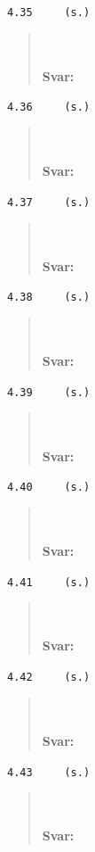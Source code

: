 \documentclass[a4paper]{article}
\newcommand{\tskcol}[1]{\textcolor{tskcol}{#1}}
\begin{document}
\texttt{\tskcol{4.35~~~~ (s.)}}
\begin{quotation}
	\noindent
	\\ \\
	\textbf{Svar:}
\end{quotation}

\texttt{\tskcol{4.36~~~~ (s.)}}
\begin{quotation}
	\noindent
	\\ \\
	\textbf{Svar:}
\end{quotation}

\texttt{\tskcol{4.37~~~~ (s.)}}
\begin{quotation}
	\noindent
	\\ \\
	\textbf{Svar:}
\end{quotation}

\texttt{\tskcol{4.38~~~~ (s.)}}
\begin{quotation}
	\noindent
	\\ \\
	\textbf{Svar:}
\end{quotation}

\texttt{\tskcol{4.39~~~~ (s.)}}
\begin{quotation}
	\noindent
	\\ \\
	\textbf{Svar:}
\end{quotation}

\texttt{\tskcol{4.40~~~~ (s.)}}
\begin{quotation}
	\noindent
	\\ \\
	\textbf{Svar:}
\end{quotation}

\texttt{\tskcol{4.41~~~~ (s.)}}
\begin{quotation}
	\noindent
	\\ \\
	\textbf{Svar:}
\end{quotation}

\texttt{\tskcol{4.42~~~~ (s.)}}
\begin{quotation}
	\noindent
	\\ \\
	\textbf{Svar:}
\end{quotation}

\texttt{\tskcol{4.43~~~~ (s.)}}
\begin{quotation}
	\noindent
	\\ \\
	\textbf{Svar:}
\end{quotation}
\end{document}
